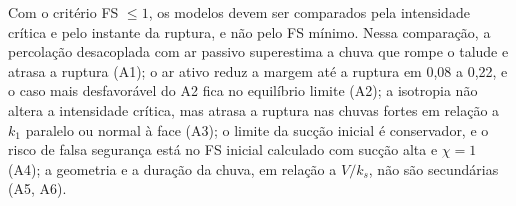 Com o crit\'erio FS $\le1$, os modelos devem ser comparados pela intensidade cr\'itica e pelo instante da ruptura, e
n\~ao pelo FS m\'inimo. Nessa compara\c{c}\~ao, a percola\c{c}\~ao desacoplada com ar passivo superestima a chuva que rompe
o talude e atrasa a ruptura (A1); o ar ativo reduz a margem at\'e a ruptura em 0,08 a 0,22, e o caso mais desfavor\'avel
do A2 fica no equil\'ibrio limite (A2); a isotropia n\~ao altera a intensidade cr\'itica, mas atrasa a ruptura nas chuvas
fortes em rela\c{c}\~ao a $k_1$ paralelo ou normal \`a face (A3); o limite da suc\c{c}\~ao inicial \'e conservador, e o risco
de falsa seguran\c{c}a est\'a no FS inicial calculado com suc\c{c}\~ao alta e $\chi=1$ (A4); a geometria e a dura\c{c}\~ao
da chuva, em rela\c{c}\~ao a $V/k_s$, n\~ao s\~ao secund\'arias (A5, A6).

